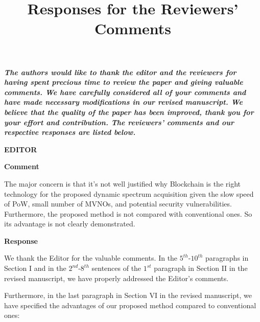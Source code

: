 \documentclass[12pt,draftcls, onecolumn]{IEEEtran}
\begin{document}
\title{Responses for the Reviewers' Comments}
\maketitle \vspace{-15mm}


\textbf{\textcolor[rgb]{0.00,0.00,1.00}{\emph{The authors would like
to thank the editor and the reviewers for having spent precious time
to review the paper and giving valuable comments. We have carefully
considered all of your comments and have made necessary
modifications in our revised manuscript. We believe that the quality
of the paper has been improved, thank you for your effort and
contribution. The reviewers' comments and our respective responses
are listed below.}}}

\vspace{5mm} \noindent\textcolor[rgb]{1.00,0.00,0.00}{\textbf{EDITOR}}

\vspace{3mm} \noindent\textcolor[rgb]{1.00,0.00,0.00}{\textbf{Comment}}
\vspace{3mm}

The major concern is that it's not well justified why Blockchain is the right technology for the proposed dynamic spectrum acquisition given the slow speed of PoW, small number of MVNOs, and potential security vulnerabilities. Furthermore, the proposed method is not compared with conventional ones. So its advantage is not clearly demonstrated.

\vspace{3mm} \noindent\textcolor[rgb]{0.00,0.00,1.00}{\textbf{Response}}
\vspace{2mm}

We thank the Editor for the valuable comments. In the $5^{th}$-$10^{th}$ paragraphs in Section I and in the $2^{nd}$-$8^{th}$ sentences of the $1^{st}$ paragraph in Section II in the revised manuscript, we have properly addressed the Editor's comments.

Furthermore, in the last paragraph in Section VI in the revised manuscript, we have specified the advantages of our proposed method compared to conventional ones:
\end{document}

